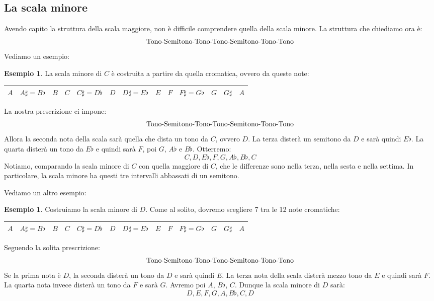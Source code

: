 \documentclass[12pt,a4paper]{report}
\theoremstyle{definition}
\theoremstyle{Theorem}
\theoremstyle{definition}
\newtheorem{Ex}[Def]{Esempio}
\theoremstyle{definition}
\theoremstyle{definition}
\begin{document}
	 		 \subsection{La scala minore}
	 		 Avendo capito la struttura della scala maggiore, non è difficile comprendere quella della scala minore. La struttura che chiediamo ora è:
	 		 $$\hbox{Tono-Semitono-Tono-Tono-Semitono-Tono-Tono}$$
	 		 Vediamo un esempio:
	 		 \begin{Ex}
	 		 	La scala minore di $C$ è costruita a partire da quella cromatica, ovvero da queste note:
	 		 	\begin{center}
	 		 		\begin{tabular}{|c|c|c|c|c|c|c|c|c|c|c|c|c|}
	 		 			\hline
	 		 			$A$&$A\sharp=B\flat$&$B$&$C$&$C\sharp=D\flat$&$D$&$D\sharp=E\flat$&$E$&$F$&$F\sharp=G\flat$&$G$&$G\sharp$&$A$ \\
	 		 			\hline
	 		 		\end{tabular}
	 		 	\end{center}
	 		 	La nostra prescrizione ci impone:
	 		 	$$\hbox{Tono-Semitono-Tono-Tono-Semitono-Tono-Tono}$$
	 		 	Allora la seconda nota della scala sarà quella che dista un tono da $C$, ovvero $D$. La terza disterà un semitono da $D$ e sarà quindi $E\flat$. La quarta disterà un tono da $E\flat$ e quindi sarà $F$, poi $G$, $A\flat$ e $B\flat$. Otterremo:
	 		 	$$C,D,E\flat,F,G,A\flat,B\flat,C$$
	 		 	Notiamo, comparando la scala minore di $C$ con quella maggiore di $C$, che le differenze sono nella terza, nella sesta e nella settima. In particolare, la scala minore ha questi tre intervalli abbassati di un semitono.
	 		 \end{Ex}
	 		 Vediamo un altro esempio:
	 		 \begin{Ex}
	 		 	Costruiamo la scala minore di $D$. Come al solito, dovremo scegliere 7 tra le 12 note cromatiche:
	 		 	\begin{center}
	 		 		\begin{tabular}{|c|c|c|c|c|c|c|c|c|c|c|c|c|}
	 		 			\hline
	 		 			$A$&$A\sharp=B\flat$&$B$&$C$&$C\sharp=D\flat$&$D$&$D\sharp=E\flat$&$E$&$F$&$F\sharp=G\flat$&$G$&$G\sharp$&$A$ \\
	 		 			\hline
	 		 		\end{tabular}
	 		 	\end{center}
	 		 	Seguendo la solita prescrizione:
	 		 		$$\hbox{Tono-Semitono-Tono-Tono-Semitono-Tono-Tono}$$
	 		 		Se la prima nota è $D$, la seconda disterà un tono da $D$ e sarà quindi $E$. La terza nota della scala disterà mezzo tono da $E$ e quindi sarà $F$. La quarta nota invece disterà un tono da $F$ e sarà $G$. Avremo poi $A$, $B\flat$, $C$. Dunque la scala minore di $D$ sarà:
	 		 		$$D,E,F,G,A,B\flat,C,D$$
	 		 \end{Ex}
\end{document}
